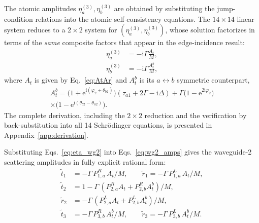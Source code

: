\documentclass[aps,pra,reprint,superscriptaddress,nofootinbib,longbibliography,floatfix]{revtex4-2}
\newcommand{\ii}{\mathrm{i}}
\newcommand{\ee}{\mathrm{e}}
\newcommand{\Del}{\Delta}
\newcommand{\Gam}{\Gamma}
\newcommand{\ph}{\varphi}
\newcommand{\thatwo}{\theta_{a2}}
\newcommand{\thbtwo}{\theta_{b2}}
\begin{document}
The atomic amplitudes $\eta_a^{(3)},\eta_b^{(3)}$ are obtained by substituting the jump-condition relations into the atomic self-consistency equations.
The $14\times14$ linear system reduces to a $2\times2$ system for $(\eta_a^{(3)},\eta_b^{(3)})$, whose solution factorizes in terms of the \emph{same} composite factors that appear in the edge-incidence result:
\begin{subequations}
\label{eq:eta_wg2}
\begin{align}
\eta_a^{(3)} &= -\ii\Gam\frac{A_t}{M},\\[2pt]
\eta_b^{(3)} &= -\ii\Gam\frac{A_t^b}{M},
\end{align}
\end{subequations}
where $A_t$ is given by Eq.~\eqref{eq:AtAr} and $A_t^b$ is its $a\leftrightarrow b$ symmetric counterpart,
\begin{align}
A_t^b = \bigl(1+\ee^{\ii(\ph_2+\thbtwo)}\bigr)(\tau_{a1}+2\Gam-\ii\Del)
       + \Gam\bigl(1-\ee^{2\ii\ph_2}\bigr) \nonumber\\
       \times\bigl(1-\ee^{\ii(\thbtwo-\thatwo)}\bigr).
\label{eq:Atb}
\end{align}
The complete derivation, including the $2\times2$ reduction and the verification by back-substitution into all 14 Schr\"{o}dinger equations, is presented in Appendix~\ref{app:derivation}.

Substituting Eqs.~\eqref{eq:eta_wg2} into Eqs.~\eqref{eq:wg2_amps} gives the waveguide-2 scattering amplitudes in fully explicit rational form:
\begin{subequations}
\label{eq:wg2_explicit}
\begin{align}
\tilde t_1 &= -\Gam\,P_{1,a}^{R}\,A_t/M, \qquad
\tilde r_1 = -\Gam\,P_{1,a}^{L}\,A_t/M,\\[2pt]
\tilde t_2 &= 1 - \Gam\,(P_{2,a}^{R}A_t + P_{2,b}^{R}A_t^b)/M,\\[2pt]
\tilde r_2 &= -\Gam\,(P_{2,a}^{L}A_t + P_{2,b}^{L}A_t^b)/M,\\[2pt]
\tilde t_3 &= -\Gam\,P_{3,b}^{R}\,A_t^b/M, \qquad
\tilde r_3 = -\Gam\,P_{3,b}^{L}\,A_t^b/M.
\end{align}
\end{subequations}
\end{document}
